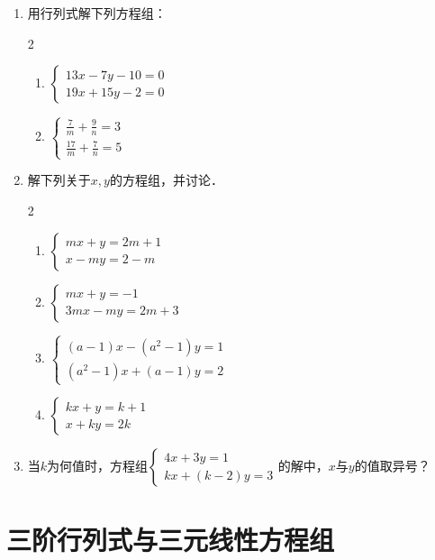 \begin{enumerate}
\item 用行列式解下列方程组：
\begin{multicols}{2}
\begin{enumerate}
    \item $\begin{cases}
        13x-7y-10=0\\19x+15y-2=0
    \end{cases}$
    \item $\begin{cases}
        \frac{7}{m}+\frac{9}{n}=3\\
        \frac{17}{m}+\frac{7}{n}=5
    \end{cases}$
\end{enumerate}
\end{multicols}
\item 解下列关于$x,y$的方程组，并讨论．
\begin{multicols}{2}
\begin{enumerate}
    \item $\begin{cases}
        mx+y=2m+1\\x-my=2-m
    \end{cases}$
    \item $\begin{cases}
        mx+y=-1\\3mx-my=2m+3
    \end{cases}$
    \item $\begin{cases}
        (a-1)x-(a^2-1)y=1\\
        (a^2-1)x+(a-1)y=2
    \end{cases}$
    \item $\begin{cases}
        kx+y=k+1\\
        x+ky=2k
    \end{cases}$
\end{enumerate}    
\end{multicols}

\item 当$k$为何值时，方程组$\begin{cases}
    4x+3y=1\\kx+(k-2)y=3
\end{cases}$的解中，$x$与$y$的值取异号？
\end{enumerate}

\section{三阶行列式与三元线性方程组}
